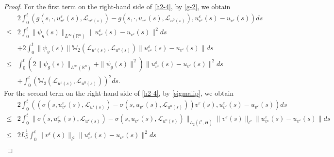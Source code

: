 \documentclass[11pt]{article}
\numberwithin{equation}{section}
\theoremstyle{plain}
\def\leq{\leqslant}
\begin{document}
\begin{proof}
    For the first term on the right-hand side of \eqref{h2-4},
    by \eqref{g-2}, we obtain
    \begin{align} \label{h2-6}
        & 2 \int_{0}^{t}
        \left( g(s, \cdot, u_{v^\varepsilon}^\varepsilon(s), \mathcal{L}_{u^\varepsilon(s)} )
        - g(s, \cdot, u_{v^\varepsilon}(s), \mathcal{L}_{u^0(s)} ),
        u_{v^\varepsilon}^\varepsilon(s) - u_{v^\varepsilon}(s)
        \right) ds  \nonumber \\
        \leq & 2
        \int_{0}^{t}
        \| \psi_g (s) \|_{  L^\infty(\mathbb{R}^n )}
        \| u_{v^\varepsilon}^\varepsilon(s) - u_{v^\varepsilon}(s)
        \|^2
        ds  \nonumber \\
        & + 2 \int_{0}^{t}
        \| \psi_g(s) \|
        \mathbb{W}_2 (\mathcal{L}_{u^\varepsilon(s)}, \mathcal{L}_{u^0(s)} )
        \|u_{v^\varepsilon}^\varepsilon(s) - u_{v^\varepsilon}(s)\|
        ds  \nonumber \\
        \leq & \int_{0}^{t}
        \left( 2 \| \psi_g
        (s) \|_{  L^\infty(\mathbb{R}^n)}
        + \| \psi_g(s) \|^2
        \right)
        \| u_{v^\varepsilon}^\varepsilon(s) - u_{v^\varepsilon}(s)
        \|^2
        ds  \nonumber \\
        & + \int_{0}^{t}
        \left( \mathbb{W}_2 (\mathcal{L}_{u^\varepsilon(s)}, \mathcal{L}_{u^0(s)} )
        \right)^2
        ds.
    \end{align}
    For the second term on the right-hand side of \eqref{h2-4},
    by \eqref{sigmalip}, we obtain
    \begin{align} \label{h2-7}
        & 2 \int_{0}^{t}
        \left(
        \left( \sigma(s, u_{v^\varepsilon}^\varepsilon(s), \mathcal{L}_{u^\varepsilon(s)} )
        - \sigma(s, u_{v^\varepsilon}(s), \mathcal{L}_{u^0(s)} )
        \right) v^\varepsilon(s),
        u_{v^\varepsilon}^\varepsilon(s) - u_{v^\varepsilon}(s)
        \right) ds
        \nonumber \\
        \leq & 2 \int_{0}^{t}
        \| \sigma(s, u_{v^\varepsilon}^\varepsilon(s), \mathcal{L}_{u^\varepsilon(s)} )
        - \sigma(s, u_{v^\varepsilon}(s), \mathcal{L}_{u^0(s)} )
        \|_{L_2(l^2, H)}
        \| v^\varepsilon(s) \|_{l^2}
        \| u_{v^\varepsilon}^\varepsilon(s) - u_{v^\varepsilon}(s) \|
        ds
        \nonumber \\
        \leq & 2 L_{\sigma}^{\frac{1}{2}}
        \int_{0}^{t}
        \| v^\varepsilon(s) \|_{l^2}
        \| u_{v^\varepsilon}^\varepsilon(s) - u_{v^\varepsilon}(s) \|^2
        ds
        \nonumber \\

\end{align}
\end{proof}
\end{document}
